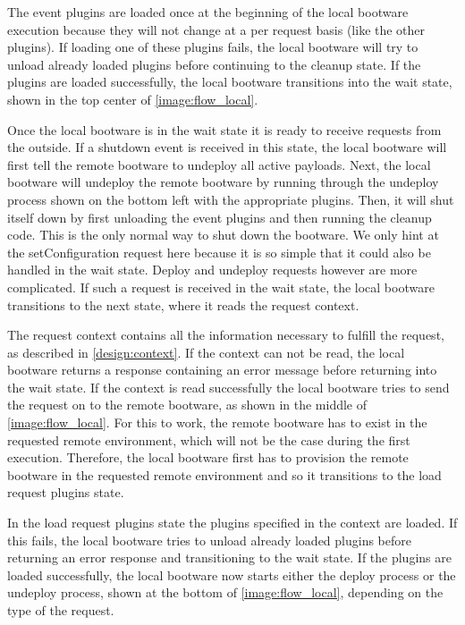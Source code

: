 The event plugins are loaded once at the beginning of the local bootware execution because they will not change at a per request basis (like the other plugins).
If loading one of these plugins fails, the local bootware will try to unload already loaded plugins before continuing to the cleanup state.
If the plugins are loaded successfully, the local bootware transitions into the wait state, shown in the top center of \autoref{image:flow_local}.

Once the local bootware is in the wait state it is ready to receive requests from the outside.
If a shutdown event is received in this state, the local bootware will first tell the remote bootware to undeploy all active payloads.
Next, the local bootware will undeploy the remote bootware by running through the undeploy process shown on the bottom left with the appropriate plugins.
Then, it will shut itself down by first unloading the event plugins and then running the cleanup code.
This is the only normal way to shut down the bootware.
We only hint at the setConfiguration request here because it is so simple that it could also be handled in the wait state.
Deploy and undeploy requests however are more complicated.
If such a request is received in the wait state, the local bootware transitions to the next state, where it reads the request context.

The request context contains all the information necessary to fulfill the request, as described in \autoref{design:context}.
If the context can not be read, the local bootware returns a response containing an error message before returning into the wait state.
If the context is read successfully the local bootware tries to send the request on to the remote bootware, as shown in the middle of \autoref{image:flow_local}.
For this to work, the remote bootware has to exist in the requested remote environment, which will not be the case during the first execution.
Therefore, the local bootware first has to provision the remote bootware in the requested remote environment and so it transitions to the load request plugins state.

In the load request plugins state the plugins specified in the context are loaded.
If this fails, the local bootware tries to unload already loaded plugins before returning an error response and transitioning to the wait state.
If the plugins are loaded successfully, the local bootware now starts either the deploy process or the undeploy process, shown at the bottom of \autoref{image:flow_local}, depending on the type of the request.

